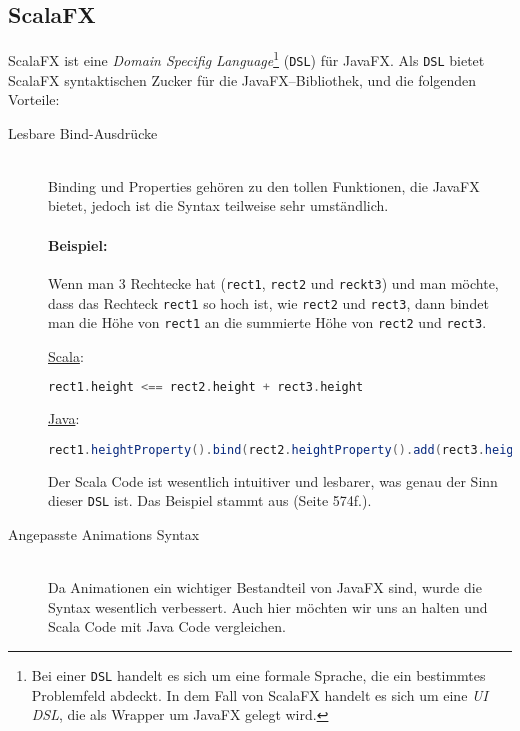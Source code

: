 \subsection{ScalaFX}
ScalaFX ist eine \textit{Domain Specifig Language}\footnote{Bei einer \texttt{DSL} handelt es sich um eine formale Sprache, die ein bestimmtes Problemfeld abdeckt. In dem Fall von ScalaFX handelt es sich um eine \textit{UI DSL}, die als Wrapper um JavaFX gelegt wird.} (\texttt{DSL}) für JavaFX. Als \texttt{DSL} bietet ScalaFX syntaktischen Zucker für die JavaFX--Bibliothek, und die folgenden Vorteile:

\begin{description}
\item[Lesbare Bind-Ausdrücke]\hfill\\
Binding und Properties gehören zu den tollen Funktionen, die JavaFX bietet, jedoch ist die Syntax teilweise sehr umständlich.
\paragraph{Beispiel:} Wenn man 3 Rechtecke hat (\texttt{rect1}, \texttt{rect2} und \texttt{reckt3}) und man möchte, dass das Rechteck \texttt{rect1} so hoch ist, wie \texttt{rect2} und \texttt{rect3}, dann bindet man die Höhe von \texttt{rect1} an die summierte Höhe von \texttt{rect2} und \texttt{rect3}.

\underline{Scala}:
\begin{lstlisting}[language=scala,caption=Scala Beispiel Code für natürliche Bindings,numbers=none]
rect1.height <== rect2.height + rect3.height
\end{lstlisting}

\underline{Java}:
\begin{lstlisting}[language=Java,caption=Das selbe Beispiel in Java,numbers=none]
rect1.heightProperty().bind(rect2.heightProperty().add(rect3.heightProperty()))
\end{lstlisting}

Der Scala Code ist wesentlich intuitiver und lesbarer, was genau der Sinn dieser \texttt{DSL} ist. Das Beispiel stammt aus \cite{ProJavaFX8} (Seite 574f.).

\item[Angepasste Animations Syntax]\hfill\\
Da Animationen ein wichtiger Bestandteil von JavaFX sind, wurde die Syntax wesentlich verbessert. Auch hier möchten wir uns an \cite{ProJavaFX8} halten und Scala Code mit Java Code vergleichen.


\end{description}
